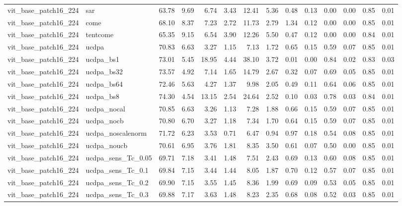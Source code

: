 \begin{tabular}{llrrrrrrrrrrrr}
vit_base_patch16_224 & sar & 63.78 & 9.69 & 6.74 & 3.43 & 12.41 & 5.36 & 0.48 & 0.13 & 0.00 & 0.00 & 0.85 & 0.01 \\
vit_base_patch16_224 & come & 68.10 & 8.37 & 7.23 & 2.72 & 11.73 & 2.79 & 1.34 & 0.12 & 0.00 & 0.00 & 0.85 & 0.01 \\
vit_base_patch16_224 & tentcome & 65.35 & 9.15 & 6.54 & 3.90 & 12.26 & 5.50 & 0.47 & 0.12 & 0.00 & 0.00 & 0.84 & 0.01 \\
vit_base_patch16_224 & ucdpa & 70.83 & 6.63 & 3.27 & 1.15 & 7.13 & 1.72 & 0.65 & 0.15 & 0.59 & 0.07 & 0.85 & 0.01 \\
vit_base_patch16_224 & ucdpa_bs1 & 73.01 & 5.45 & 18.95 & 4.44 & 38.10 & 3.72 & 0.01 & 0.00 & 0.84 & 0.02 & 0.83 & 0.03 \\
vit_base_patch16_224 & ucdpa_bs32 & 73.57 & 4.92 & 7.14 & 1.65 & 14.79 & 2.67 & 0.32 & 0.07 & 0.69 & 0.05 & 0.85 & 0.01 \\
vit_base_patch16_224 & ucdpa_bs64 & 72.46 & 5.63 & 4.27 & 1.37 & 9.98 & 2.05 & 0.49 & 0.11 & 0.64 & 0.06 & 0.85 & 0.01 \\
vit_base_patch16_224 & ucdpa_bs8 & 74.30 & 4.54 & 13.15 & 2.54 & 24.64 & 2.52 & 0.10 & 0.03 & 0.78 & 0.03 & 0.84 & 0.01 \\
vit_base_patch16_224 & ucdpa_nocal & 70.85 & 6.63 & 3.26 & 1.13 & 7.28 & 1.88 & 0.66 & 0.15 & 0.59 & 0.07 & 0.85 & 0.01 \\
vit_base_patch16_224 & ucdpa_nocb & 70.80 & 6.70 & 3.27 & 1.18 & 7.34 & 1.70 & 0.64 & 0.15 & 0.59 & 0.07 & 0.85 & 0.01 \\
vit_base_patch16_224 & ucdpa_noscalenorm & 71.72 & 6.23 & 3.53 & 0.71 & 6.47 & 0.94 & 0.97 & 0.18 & 0.54 & 0.08 & 0.85 & 0.01 \\
vit_base_patch16_224 & ucdpa_noucb & 70.61 & 6.95 & 3.76 & 1.81 & 8.35 & 3.50 & 0.61 & 0.07 & 0.50 & 0.00 & 0.85 & 0.01 \\
vit_base_patch16_224 & ucdpa_sens_Tc_0.05 & 69.71 & 7.18 & 3.41 & 1.48 & 7.51 & 2.43 & 0.69 & 0.13 & 0.60 & 0.08 & 0.85 & 0.01 \\
vit_base_patch16_224 & ucdpa_sens_Tc_0.1 & 69.84 & 7.15 & 3.44 & 1.44 & 8.05 & 1.87 & 0.70 & 0.12 & 0.57 & 0.07 & 0.85 & 0.01 \\
vit_base_patch16_224 & ucdpa_sens_Tc_0.2 & 69.90 & 7.15 & 3.55 & 1.45 & 8.36 & 1.99 & 0.69 & 0.09 & 0.53 & 0.05 & 0.85 & 0.01 \\
vit_base_patch16_224 & ucdpa_sens_Tc_0.3 & 69.88 & 7.17 & 3.63 & 1.48 & 8.23 & 2.35 & 0.68 & 0.08 & 0.52 & 0.03 & 0.85 & 0.01 \\

\end{tabular}
